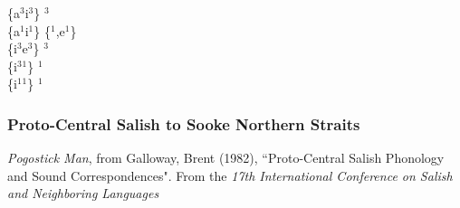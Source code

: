 \documentclass[11pt]{article}
\begin{document}
\{a$^3$\raisebox{-0.7ex}{\textasciitilde}i$^3$\} \textrightarrow\hspace{0pt} $^3$ \\
\{a$^1$\raisebox{-0.7ex}{\textasciitilde}i$^1$\} \textrightarrow\hspace{0pt} \{$^1$,e$^1$\} \\
\{i$^3$\raisebox{-0.7ex}{\textasciitilde}e$^3$\} \textrightarrow\hspace{0pt} $^3$ \\
\{i$^3$\raisebox{-0.7ex}{\textasciitilde}$^1$\} \textrightarrow\hspace{0pt} $^1$ \\
\{i$^1$\raisebox{-0.7ex}{\textasciitilde}$^1$\} \textrightarrow\hspace{0pt} $^1$

\subsubsection{Proto-Central Salish to Sooke Northern Straits}\textit{Pogostick Man}, from Galloway, Brent (1982), \textquotedblleft Proto-Central Salish Phonology and Sound Correspondences". From the \textit{17th International Conference on Salish and Neighboring Languages}
\end{document}
